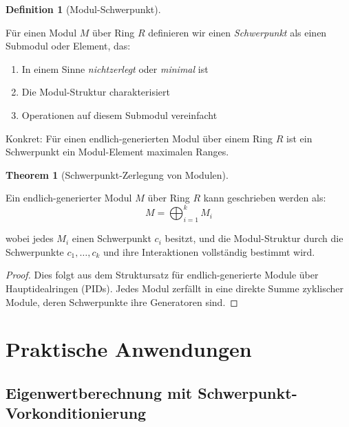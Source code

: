 \documentclass[a4paper,12pt]{article}
\theoremstyle{definition}
\newtheorem{definition}{Definition}
\newtheorem{theorem}{Theorem}
\begin{document}
\begin{definition}[Modul-Schwerpunkt]
\label{def:modul_schwerpunkt}

Für einen Modul $M$ über Ring $R$ definieren wir einen \emph{Schwerpunkt} als einen Submodul oder Element, das:

\begin{enumerate}
\item In einem Sinne \emph{nichtzerlegt} oder \emph{minimal} ist
\item Die Modul-Struktur charakterisiert
\item Operationen auf diesem Submodul vereinfacht
\end{enumerate}

Konkret: Für einen endlich-generierten Modul über einem Ring $R$ ist ein Schwerpunkt ein Modul-Element maximalen Ranges.
\end{definition}

\begin{theorem}[Schwerpunkt-Zerlegung von Modulen]
\label{thm:modul_schwerpunkt_zerlegung}

Ein endlich-generierter Modul $M$ über Ring $R$ kann geschrieben werden als:
\[
M = \bigoplus_{i=1}^k M_i
\]

wobei jedes $M_i$ einen Schwerpunkt $c_i$ besitzt, und die Modul-Struktur durch die Schwerpunkte $c_1, \ldots, c_k$ und ihre Interaktionen vollständig bestimmt wird.

\begin{proof}
Dies folgt aus dem Struktursatz für endlich-generierte Module über Hauptidealringen (PIDs). Jedes Modul zerfällt in eine direkte Summe zyklischer Module, deren Schwerpunkte ihre Generatoren sind.
\end{proof}
\end{theorem}

\section{Praktische Anwendungen}

\subsection{Eigenwertberechnung mit Schwerpunkt-Vorkonditionierung}
\end{document}
